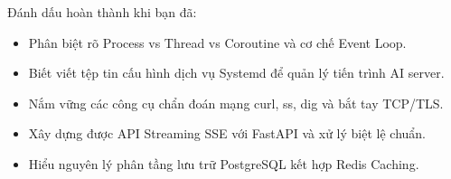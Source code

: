 \begin{checkpointbox}
Đánh dấu hoàn thành khi bạn đã:
\begin{itemize}
  \item[$\square$] Phân biệt rõ Process vs Thread vs Coroutine và cơ chế Event Loop.
  \item[$\square$] Biết viết tệp tin cấu hình dịch vụ Systemd để quản lý tiến trình AI server.
  \item[$\square$] Nắm vững các công cụ chẩn đoán mạng curl, ss, dig và bắt tay TCP/TLS.
  \item[$\square$] Xây dựng được API Streaming SSE với FastAPI và xử lý biệt lệ chuẩn.
  \item[$\square$] Hiểu nguyên lý phân tầng lưu trữ PostgreSQL kết hợp Redis Caching.
\end{itemize}
\end{checkpointbox}
